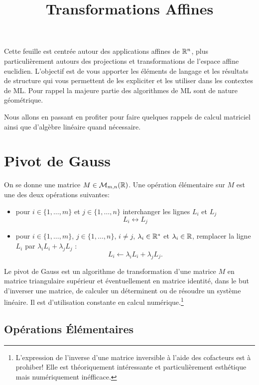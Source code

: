 \documentclass[11pt, a4paper]{article}
\title{%
  { \huge Transformations Affines}%
}
\author{}
\date{}
\begin{document}
\maketitle\thispagestyle{fancy}

Cette feuille est centrée autour des applications affines de $\mathbb{R}^n$,
plus particulièrement autours des projections et transformations de
l'espace affine euclidien. L'objectif est de vous apporter les
éléments de langage et les résultats de structure qui vous permettent
de les expliciter et les utiliser dans les contextes de ML. Pour
rappel la majeure partie des algorithmes de ML sont de nature
géométrique.

Nous allons en passant en profiter pour faire quelques rappels de
calcul matriciel ainsi que d'algèbre linéaire quand nécessaire.

\section{Pivot de Gauss}
\label{sec:pivotGauss}

On se donne une matrice $M \in \mathcal{M}_{m, n}(\mathbb{R})$. Une opération
élémentaire sur $M$ est une des deux opérations suivantes:
\begin{itemize}
\item[\textbullet]
  pour $i \in \{1, \ldots, m\}$ et $j \in \{1, \ldots, n\}$
  interchanger les lignes $L_i$ et $L_j$
  \[
  L_i \leftrightarrow L_j
  \]
\item[\textbullet]
  pour $i \in \{1, \ldots, m\}$, $j \in \{1, \ldots, n\}$, $i \neq j$,
  $\lambda_i \in \mathbb{R}^*$ et $\lambda_i \in \mathbb{R}$, remplacer la ligne $L_i$
  par $\lambda_i L_i + \lambda_jL_j$ :
  \[
  L_i \leftarrow \lambda_iL_i + \lambda_jL_j.
  \]
\end{itemize}
Le pivot de Gauss est un algorithme de transformation d'une matrice
$M$ en matrice triangulaire supérieur et éventuellement en matrice
identité, dans le but d'inverser une matrice, de calculer un
déterminent ou de résoudre un système linéaire. Il est d'utilisation
constante en calcul numérique.\footnote{L'expression de l'inverse
  d'une matrice inversible à l'aide des cofacteurs est à prohiber!
  Elle est théoriquement intéressante et particulièrement esthétique
  mais numériquement inéfficace.}

\subsection{Opérations Élémentaires}
\label{subsec:opElementaires}
\end{document}
